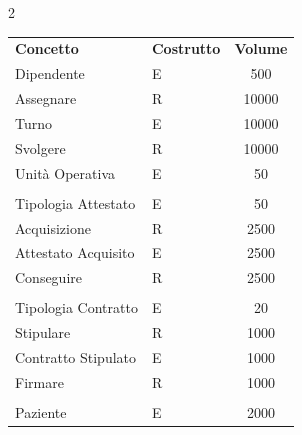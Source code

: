 \documentclass[a4paper, 12pt]{report}
\newenvironment{changemargin}[2]{%
  \begin{list}{}{%
    \setlength{\topsep}{0pt}%
    \setlength{\leftmargin}{#1}%
    \setlength{\rightmargin}{#2}%
    \setlength{\listparindent}{\parindent}%
    \setlength{\itemindent}{\parindent}%
    \setlength{\parsep}{\parskip}%
  }%
  \item[]}{\end{list}}
\begin{document}
\begin{changemargin}{-1cm}{-1cm}
        \begin{multicols}{2}
                \renewcommand{\arraystretch}{1.2}
                \begin{tabularx}{8.5cm}{lXc}
                        \rowcolor{seaGreen}
                        \textbf{Concetto} & \textbf{Costrutto} & \textbf{Volume} \\
                        Dipendente & E & 500 \\
                        \hline
                        Assegnare & R & 10000 \\
                        \hline
                        Turno & E & 10000 \\
                        \hline
                        Svolgere & R & 10000 \\
                        \hline
                        Unità Operativa & E & 50 \\
                        \hline
                        \vspace{\baselineskip} \\
                        \hline
                        Tipologia Attestato & E & 50 \\
                        \hline
                        Acquisizione & R & 2500 \\
                        \hline
                        Attestato Acquisito & E & 2500 \\
                        \hline
                        Conseguire & R & 2500 \\
                        \hline
                        \vspace{\baselineskip} \\
                        \hline
                        Tipologia Contratto & E & 20 \\
                        \hline
                        Stipulare & R & 1000 \\
                        \hline
                        Contratto Stipulato & E & 1000 \\
                        \hline
                        Firmare & R & 1000 \\
                        \hline
                        \vspace{\baselineskip} \\
                        \hline
                        Paziente & E & 2000 \\

\end{tabularx}
\end{multicols}
\end{changemargin}
\end{document}
